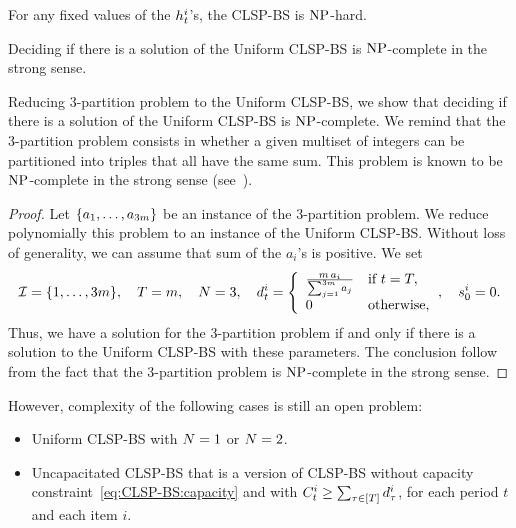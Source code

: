 For any fixed values of the $h_t^i$'s, the CLSP-BS is $\operatorname{NP}$-hard.

\begin{thm}
  Deciding if there is a solution of the Uniform CLSP-BS is $\operatorname{NP}$-complete in the strong sense.
\end{thm}



Reducing 3-partition problem to the Uniform CLSP-BS, we show that deciding if there is a solution of the Uniform CLSP-BS is $\operatorname{NP}$-complete. We remind that the 3-partition problem consists in whether a given multiset of integers can be partitioned into triples that all have the same sum. This problem is known to be $\operatorname{NP}$-complete in the strong sense (see~\cite{Garey1979}).



\begin{proof}
Let $\crbracket{a_1,\ldots,a_{3m}}$ be an instance of the 3-partition problem.
We reduce polynomially this problem to an instance of the Uniform CLSP-BS.
Without loss of generality, we can assume that sum of the $a_i$'s is positive.
We set
\begin{equation}
  \REF=\range[1]{3m}
  ,\quad
  \horizon=m
  ,\quad
  \nbsetups=3
  ,\quad
  \demand_t^i
  =\left\{
  \begin{array}{ll}
  \frac{m\,a_i}{\sum_{j=1}^{3m}a_j} & \mbox{if}\ t=\horizon,
  \\
  0 & \mbox{otherwise,}\end{array}
  \right.
  ,\quad
  \inventory_0^i=0.
\end{equation}
Thus, we have a solution for the 3-partition problem if and only if there is a solution to the Uniform CLSP-BS with these parameters. The conclusion follow from the fact that the 3-partition problem is $\operatorname{NP}$-complete in the strong sense.
\end{proof}


However, complexity of the following cases is still an open problem:
\begin{itemize}
\item Uniform CLSP-BS with $N=1$ or $N=2$.
\item Uncapacitated CLSP-BS that is a version of CLSP-BS without capacity constraint~\eqref{eq:CLSP-BS:capacity} and with $\capacity_t^i\ge\sum_{\tau\in\range{\horizon}}\demand_{\tau}^i$, for each period $t$ and each item $i$.
\end{itemize}



